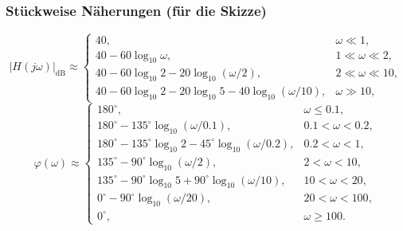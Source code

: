 \subsubsection*{Stückweise Näherungen (für die Skizze)}
\[
|H(j\omega)|_{\mathrm{dB}}\approx
\begin{cases}
40,& \omega\ll 1,\\[2pt]
40-60\log_{10}\omega,& 1\ll\omega\ll 2,\\[2pt]
40-60\log_{10}2-20\log_{10}(\omega/2),& 2\ll\omega\ll 10,\\[2pt]
40-60\log_{10}2-20\log_{10}5-40\log_{10}(\omega/10),& \omega\gg 10,
\end{cases}
\]\[
\varphi(\omega)\approx
\begin{cases}
180^\circ,& \omega\le 0.1,\\[2pt]
180^\circ-135^\circ\log_{10}(\omega/0.1),& 0.1<\omega<0.2,\\[2pt]
180^\circ-135^\circ\log_{10}2-45^\circ\log_{10}(\omega/0.2),& 0.2<\omega<1,\\[2pt]
135^\circ-90^\circ\log_{10}(\omega/2),& 2<\omega<10,\\[2pt]
135^\circ-90^\circ\log_{10}5+90^\circ\log_{10}(\omega/10),& 10<\omega<20,\\[2pt]
0^\circ-90^\circ\log_{10}(\omega/20),& 20<\omega<100,\\[2pt]
0^\circ,& \omega\ge 100.
\end{cases}
\]

\newpage